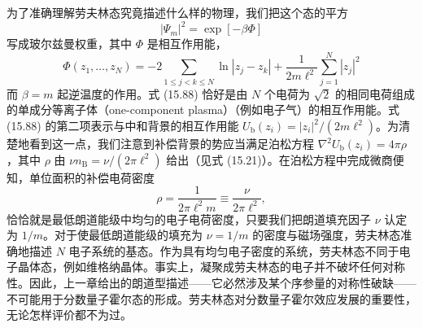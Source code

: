 为了准确理解劳夫林态究竟描述什么样的物理，我们把这个态的平方
\begin{equation*}
|\Psi_{m}|^{2}=\exp[-\beta\Phi]\tag{15.87}
\end{equation*}
写成玻尔兹曼权重，其中 $\Phi$ 是相互作用能，
\begin{equation*}
\Phi(z_{1},\ldots,z_{N})=-2\sum_{1\le j<k\le N}\ln|z_{j}-z_{k}|+\frac{1}{2m\ell^{2}}\sum_{j=1}^{N}|z_{j}|^{2}\tag{15.88}
\end{equation*}
而 $\beta=m$ 起逆温度的作用。式 (15.88) 恰好是由 $N$ 个电荷为 $\sqrt{2}$ 的相同电荷组成的单成分等离子体（one-component plasma）（例如电子气）的相互作用能。式 (15.88) 的第二项表示与中和背景的相互作用能 $U_{\mathrm{b}}(z_{i})=|z_{i}|^{2}/(2m\ell^{2})$。为清楚地看到这一点，我们注意到补偿背景的势应当满足泊松方程 $\nabla^{2}U_{\mathrm{b}}(z_{i})=4\pi\rho$，其中 $\rho$ 由 $\nu n_{\mathrm{B}}=\nu/(2\pi\ell^{2})$ 给出（见式 (15.21)）。在泊松方程中完成微商便知，单位面积的补偿电荷密度
\begin{equation*}
\rho=\frac{1}{2\pi\ell^{2}m}\equiv\frac{\nu}{2\pi\ell^{2}},\tag{15.89}
\end{equation*}
恰恰就是最低朗道能级中均匀的电子电荷密度，只要我们把朗道填充因子 $\nu$ 认定为 $1/m$。对于使最低朗道能级的填充为 $\nu=1/m$ 的密度与磁场强度，劳夫林态准确地描述 $N$ 电子系统的基态。作为具有均匀电子密度的系统，劳夫林态不同于电子晶体态，例如维格纳晶体。事实上，凝聚成劳夫林态的电子并不破坏任何对称性。因此，上一章给出的朗道型描述——它必然涉及某个序参量的对称性破缺——不可能用于分数量子霍尔态的形成。劳夫林态对分数量子霍尔效应发展的重要性，无论怎样评价都不为过。

